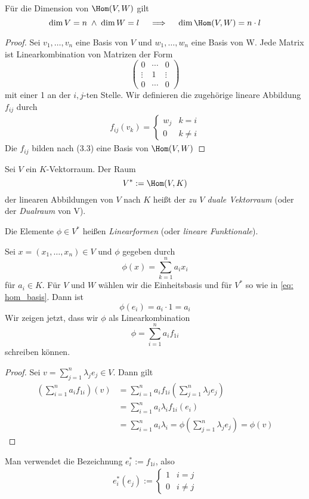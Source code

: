 \documentclass[a4paper, 10pt]{scrbook}
\begin{document}
Für die Dimension von $\Hom(V,W)$ gilt
\[
	\dim V=n \;\land\; \dim W=l \quad \implies\quad \dim \Hom(V,W)=n\cdot l
\]
\begin{proof}
Sei $v_1,\dotsc,v_n$ eine Basis von $V$ und $w_1,\dotsc,w_n$ eine Basis von W.
Jede Matrix ist Linearkombination von Matrizen der Form 
\[
	\begin{pmatrix}0&\cdots&0\\\vdots&1&\vdots\\0&\cdots&0\end{pmatrix}
\]
mit einer 1 an der $i,j$-ten Stelle.
Wir definieren die zugehörige lineare Abbildung $f_{ij}$ durch
\begin{align}
\label{eq: hom_basis}
f_{ij}(v_k)=\begin{cases}
w_j & k=i\\
0 & k\neq i
\end{cases}
\end{align}
Die $f_{ij}$ bilden nach (3.3) eine Basis von $\Hom(V,W)$
\end{proof}

\begin{df}
\label{df:9.1}
Sei $V$ ein $K$-Vektorraum.
Der Raum 
\[
	V^*:=\Hom(V,K)
\]
der linearen Abbildungen von $V$ nach $K$ heißt der \emph{zu $V$ duale Vektorraum} (oder der \emph{Dualraum} von V).

Die Elemente $\phi\in V^*$ heißen \emph{Linearformen} (oder \emph{lineare Funktionale}).
\begin{ex}
	Sei $x=(x_1,\dotsc,x_n)\in V$ und $\phi$ gegeben durch
	\[
		\phi(x) = \sum_{k=1}^n a_ix_i
	\]
	für $a_i \in K$.
	Für $V$ und $W$ wählen wir die Einheitsbasis und für $V^*$ so wie in \eqref{eq: hom_basis}.
	Dann ist
	\[
	\phi(e_i)=a_i\cdot1=a_i
	\]
Wir zeigen jetzt, dass wir $\phi$ als Linearkombination
\[
	\phi=\sum_{i=1}^na_if_{1i}
\]
schreiben können.
\begin{proof}
Sei $v=\sum_{j=1}^n\lambda_je_j\in V$.
Dann gilt
\begin{align*}
\left(\sum_{i=1}^na_if_{1i}\right)(v)
&=\sum_{i=1}^na_if_{1i}\left(\sum_{j=1}^n\lambda_je_j\right)\\
&=\sum_{i=1}^na_i\lambda_if_{1i}(e_i)\\
&=\sum_{i=1}^na_i\lambda_i= \phi\left(\sum_{j=1}^n \lambda_je_j\right) = \phi(v)
\end{align*}
\end{proof}
Man verwendet die Bezeichnung $e_{i}^*:=f_{1i}$, also
\begin{align*}
e_{i}^*(e_j):=\begin{cases}
1&i=j\\
0&i\neq j
\end{cases}
\end{align*}
\end{ex}
\end{df}
\end{document}
